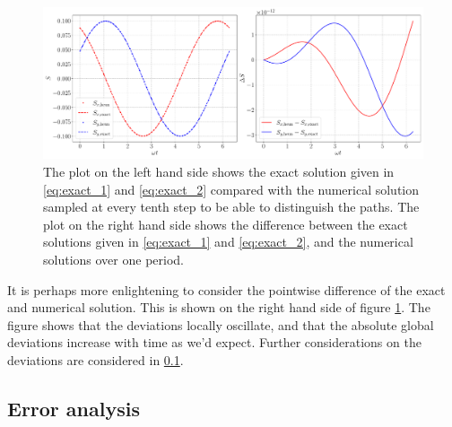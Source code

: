 \begin{figure}[htb]
	\centering
	\includegraphics[width=\columnwidth]{../fig/comparison.pdf}
	\caption{The plot on the left hand side shows the exact solution given in \eqref{eq:exact_1} and \eqref{eq:exact_2} compared with the numerical solution sampled at every tenth step to be able to distinguish the paths. The plot on the right hand side shows the difference between the exact solutions given in \eqref{eq:exact_1} and \eqref{eq:exact_2}, and the numerical solutions over one period.}
	\label{fig:comp}
\end{figure} 
It is perhaps more enlightening to consider the pointwise difference of the exact and numerical solution. This is shown on the right hand side of figure \ref{fig:comp}. The figure shows that the deviations locally oscillate, and that the absolute global deviations increase with time as we'd expect. Further considerations on the deviations are considered in \ref{sec:error}.

\newpage

\subsection{Error analysis}\label{sec:error}

